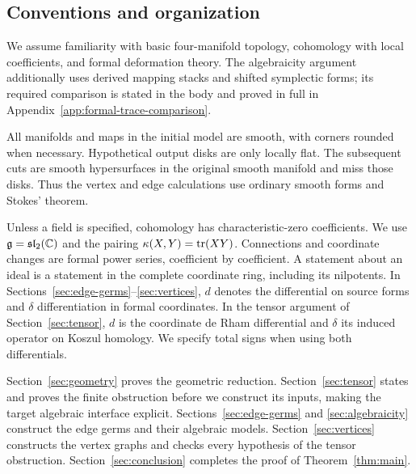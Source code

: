 \subsection{Conventions and organization}

We assume familiarity with basic four-manifold topology, cohomology with
local coefficients, and formal deformation theory. The algebraicity
argument additionally uses derived mapping stacks and shifted symplectic
forms; its required comparison is stated in the body and proved in full
in Appendix~\ref{app:formal-trace-comparison}.

All manifolds and maps in the initial model are smooth, with corners rounded
when necessary. Hypothetical output disks are only locally flat. The subsequent
cuts are smooth hypersurfaces in the original smooth manifold and miss those
disks. Thus the vertex and edge calculations use ordinary smooth forms and
Stokes' theorem.

Unless a field is specified, cohomology has characteristic-zero coefficients.
We use \(\mathfrak{g}=\mathfrak{sl}_2(\mathbb C)\) and the pairing
\(\kappa(X,Y)=\operatorname{tr}(XY)\). Connections and coordinate changes are formal power
series, coefficient by coefficient. A statement about an ideal is a statement
in the complete coordinate ring, including its nilpotents.
In Sections~\ref{sec:edge-germs}--\ref{sec:vertices}, \(d\) denotes the
differential on source forms and \(\delta\) differentiation in formal
coordinates. In the tensor argument of Section~\ref{sec:tensor}, \(d\) is
the coordinate de Rham differential and \(\delta\) its induced operator on
Koszul homology. We specify total signs when using both differentials.

Section~\ref{sec:geometry} proves the geometric reduction.
Section~\ref{sec:tensor} states and proves the finite obstruction before
we construct its inputs, making the target algebraic interface explicit.
Sections~\ref{sec:edge-germs} and \ref{sec:algebraicity}
construct the edge germs and their algebraic models.
Section~\ref{sec:vertices} constructs the vertex graphs and checks every
hypothesis of the tensor obstruction. Section~\ref{sec:conclusion} completes
the proof of Theorem~\ref{thm:main}.
